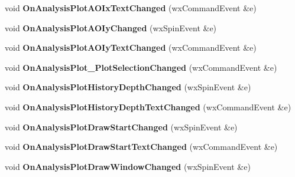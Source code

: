 \begin{DoxyCompactItemize}
\item 
\hypertarget{class_prop_view_frame_af6d822b0ca492fb1bae3751dfa058e6c}{void {\bfseries On\+Analysis\+Plot\+A\+O\+Ix\+Text\+Changed} (wx\+Command\+Event \&e)}\label{class_prop_view_frame_af6d822b0ca492fb1bae3751dfa058e6c}

\item 
\hypertarget{class_prop_view_frame_a67af72a1f4dce70881aaa84db52480eb}{void {\bfseries On\+Analysis\+Plot\+A\+O\+Iy\+Changed} (wx\+Spin\+Event \&e)}\label{class_prop_view_frame_a67af72a1f4dce70881aaa84db52480eb}

\item 
\hypertarget{class_prop_view_frame_ae629fa811ea2a599cd924324c9163622}{void {\bfseries On\+Analysis\+Plot\+A\+O\+Iy\+Text\+Changed} (wx\+Command\+Event \&e)}\label{class_prop_view_frame_ae629fa811ea2a599cd924324c9163622}

\item 
\hypertarget{class_prop_view_frame_a7ddca8e55ebb17e0daa0b0274107c720}{void {\bfseries On\+Analysis\+Plot\+\_\+\+Plot\+Selection\+Changed} (wx\+Command\+Event \&e)}\label{class_prop_view_frame_a7ddca8e55ebb17e0daa0b0274107c720}

\item 
\hypertarget{class_prop_view_frame_a4b3ef1126a20bbc3ab515ef7c0873c01}{void {\bfseries On\+Analysis\+Plot\+History\+Depth\+Changed} (wx\+Spin\+Event \&e)}\label{class_prop_view_frame_a4b3ef1126a20bbc3ab515ef7c0873c01}

\item 
\hypertarget{class_prop_view_frame_ae3f02ec95554dee61e5d37cb8700f4fe}{void {\bfseries On\+Analysis\+Plot\+History\+Depth\+Text\+Changed} (wx\+Command\+Event \&e)}\label{class_prop_view_frame_ae3f02ec95554dee61e5d37cb8700f4fe}

\item 
\hypertarget{class_prop_view_frame_aba244b3679a98b2bd242d382f4b6d1c5}{void {\bfseries On\+Analysis\+Plot\+Draw\+Start\+Changed} (wx\+Spin\+Event \&e)}\label{class_prop_view_frame_aba244b3679a98b2bd242d382f4b6d1c5}

\item 
\hypertarget{class_prop_view_frame_af9523db61aa6b0d85751bf8039323f1f}{void {\bfseries On\+Analysis\+Plot\+Draw\+Start\+Text\+Changed} (wx\+Command\+Event \&e)}\label{class_prop_view_frame_af9523db61aa6b0d85751bf8039323f1f}

\item 
\hypertarget{class_prop_view_frame_a8045dd6ab123b5b80ca26b3c151a8447}{void {\bfseries On\+Analysis\+Plot\+Draw\+Window\+Changed} (wx\+Spin\+Event \&e)}\label{class_prop_view_frame_a8045dd6ab123b5b80ca26b3c151a8447}


\end{DoxyCompactItemize}
